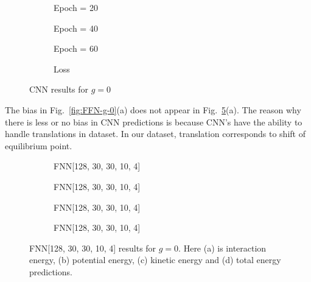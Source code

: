 \documentclass[a4paper,times,12pt]{article}
\begin{document}
\begin{figure}[H]
    \centering
    \begin{subfigure}[t]{0.45\textwidth}
		\centering
        
        \caption{Epoch = 20}
		\label{fig:a}
    \end{subfigure}
    \begin{subfigure}[t]{0.45\textwidth}
		\centering
        
        \caption{Epoch = 40}
		\label{fig:b}
    \end{subfigure}    
    \begin{subfigure}[t]{0.45\textwidth}
        \centering
        
        \caption{Epoch = 60}
		\label{fig:c}
    \end{subfigure}
    \begin{subfigure}[t]{0.45\textwidth}
        \centering
        
        \caption{Loss}
		\label{fig:c}
    \end{subfigure}
    \caption{CNN results for $g = 0$}
\label{fig:CNN-g-0}
\end{figure}

The bias in Fig.~\ref{fig:FFN-g-0}(a) does not appear in Fig.~\ref{fig:CNN-g-0}(a). The reason why there is less or no bias in CNN predictions is because CNN's have the ability to handle translations in dataset. In our dataset, translation corresponds to shift of equilibrium point. 

\begin{figure}[H]
    \centering
    \begin{subfigure}[t]{0.45\textwidth}
		\centering
        
        \caption{FNN[128, 30, 30, 10, 4]}
		\label{fig:a}
    \end{subfigure}
    \begin{subfigure}[t]{0.45\textwidth}
		\centering
        
        \caption{FNN[128, 30, 30, 10, 4]}
		\label{fig:b}
    \end{subfigure}    
    \begin{subfigure}[t]{0.45\textwidth}
        \centering
        
        \caption{FNN[128, 30, 30, 10, 4]}
		\label{fig:c}
    \end{subfigure}
    \begin{subfigure}[t]{0.45\textwidth}
        \centering
        
        \caption{FNN[128, 30, 30, 10, 4]}
		\label{fig:c}
    \end{subfigure}
	\caption{FNN[128, 30, 30, 10, 4] results for $g = 0$. Here (a) is interaction energy, (b) potential energy, (c) kinetic energy and (d) total energy predictions.}
\label{fig:FFN-g-0-S}
\end{figure}
\end{document}
